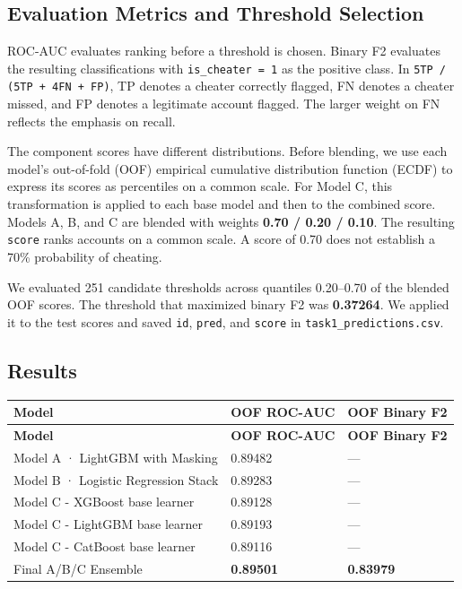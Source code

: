 \documentclass[11pt,a4paper]{article}
\newcommand{\reserveheading}[1]{\par\ifdim\dimexpr\pagegoal-\pagetotal\relax<#1\relax\newpage\fi}
\begin{document}
\reserveheading{7\baselineskip}
\subsection{Evaluation Metrics and Threshold Selection}

ROC-AUC evaluates ranking before a threshold is chosen. Binary F2 evaluates the resulting classifications with \texttt{is\_\allowbreak{}cheater = 1} as the positive class. In \texttt{5TP / (5TP + 4FN + FP)}, TP denotes a cheater correctly flagged, FN denotes a cheater missed, and FP denotes a legitimate account flagged. The larger weight on FN reflects the emphasis on recall.

The component scores have different distributions. Before blending, we use each model's out-of-fold (OOF) empirical cumulative distribution function (ECDF) to express its scores as percentiles on a common scale. For Model C, this transformation is applied to each base model and then to the combined score. Models A, B, and C are blended with weights \textbf{0.70 / 0.20 / 0.10}. The resulting \texttt{score} ranks accounts on a common scale. A score of 0.70 does not establish a 70\% probability of cheating.

We evaluated 251 candidate thresholds across quantiles 0.20–0.70 of the blended OOF scores. The threshold that maximized binary F2 was \textbf{0.37264}. We applied it to the test scores and saved \texttt{id}, \texttt{pred}, and \texttt{score} in \texttt{task1\_\allowbreak{}predictions.csv}.

\reserveheading{16\baselineskip}
\subsection{Results}

\begingroup\small
\begin{longtable}{@{}L{.47\linewidth}L{.20\linewidth}L{.24\linewidth}@{}}
\toprule
\textbf{Model} & \textbf{OOF ROC-AUC} & \textbf{OOF Binary F2} \\
\midrule
\endfirsthead
\toprule
\textbf{Model} & \textbf{OOF ROC-AUC} & \textbf{OOF Binary F2} \\
\midrule
\endhead
\bottomrule
\endfoot
Model A · LightGBM with Masking & 0.89482 & — \\
Model B · Logistic Regression Stack & 0.89283 & — \\
Model C - XGBoost base learner & 0.89128 & — \\
Model C - LightGBM base learner & 0.89193 & — \\
Model C - CatBoost base learner & 0.89116 & — \\
Final A/B/C Ensemble & \textbf{0.89501} & \textbf{0.83979} \\
\end{longtable}
\endgroup
\end{document}
